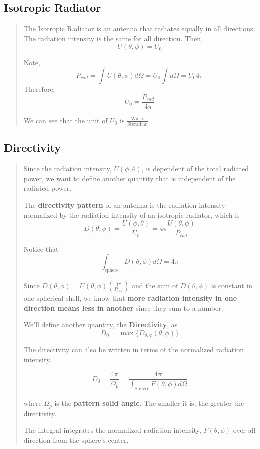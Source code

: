 \documentclass{article} %
\begin{document}
\subsection{Isotropic Radiator}
\begin{quote}
    The Isotropic Radiator is an antenna that radiates equally in all directions; The radiation intensity is the same for all direction. Then,
    \[U(\theta, \phi) = U_0\]

    Note,
    \[P_{rad} = \int U(\theta, \phi) d\Omega = U_0 \int d\Omega = U_0 4\pi\]
    Therefore,
    \[U_0 = \frac{P_{rad}}{4\pi}\]

    We can see that the unit of $U_0$ is $\frac{\text{Watts}}{\text{Steradian}}$.

\end{quote}

\subsection{Directivity}
\begin{quote}
    Since the radiation intensity, $U(\phi, \theta)$, is dependent of the total radiated power, we want to define another quantity that is independent of the radiated power.

    The \textbf{directivity pattern} of an antenna is the radiation intensity normalized by the radiation intensity of an isotropic radiator, which is
    \[D(\theta, \phi) = \frac{U(\phi, \theta)}{U_0} = 4 \pi \frac{U(\theta, \phi)}{P_{rad}}\]

    Notice that \[\int_{\text{sphere}}D(\theta, \phi)  d\Omega = 4 \pi\]

    Since $D(\theta, \phi) = U(\theta, \phi)(\frac{4\pi}{P_{rad}})$ and the sum of $D(\theta, \phi)$ is constant in one spherical shell, we know that \textbf{more radiation intensity in one direction means less in another} since they sum to a number.
    \bigskip

    We'll define another quantity, the \textbf{Directivity}, as
    \[D_0 = \max\{D_{\theta, \phi}(\theta, \phi)\}\]

    The directivity can also be written in terms of the normalized radiation intensity.

    \[D_0 = \frac{4 \pi}{\Omega_p} = \frac{4\pi}{\int_{\text{Sphere}} F(\theta, \phi) d\Omega}\]

    where $\Omega_p$ is the \textbf{pattern solid angle}. The smaller it is, the greater the directivity.

    The integral integrates the normalized radiation intensity, $F(\theta, \phi)$ over all direction from the sphere's center.

\end{quote}
\end{document}
